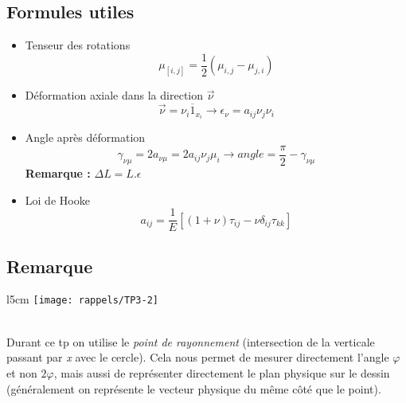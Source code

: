 \subsection*{Formules utiles}
\begin{itemize}
	\item Tenseur des rotations
		\begin{equation}
			\mu _{[i,j]} = \frac{1}{2}(\mu _{i,j} - \mu _{j,i})
		\end{equation}
		
	\item Déformation axiale dans la direction $\vec{\nu}$
		\begin{equation}
			\vec{\nu} = \nu _i \overline{1}_{x_i} \rightarrow \epsilon _{\nu} = a_{ij} \nu _j \nu _i
		\end{equation}
		
	\item	Angle après déformation 
		\begin{equation}
			\gamma _{\nu \mu} = 2 a_{\nu \mu} = 2 a_{ij} \nu _j \mu _i \rightarrow angle = \frac{\pi}{2} - \gamma _{\nu \mu} 
		\end{equation}
\textbf{Remarque :} $\Delta L = L.\epsilon$		
	\item Loi de Hooke
		\begin{equation}
			a_{ij} = \frac{1}{E}[(1+\nu)\tau _{ij} - \nu \delta _{ij}\tau _{kk}]
		\end{equation}							
\end{itemize}

\subsection*{Remarque}
\begin{wrapfigure}[7]{l}{5cm}
\texttt{[image: rappels/TP3-2]}
\end{wrapfigure}
\ \\ Durant ce tp on utilise le \textit{point de rayonnement} (intersection de la verticale passant par \textit{x} avec le cercle). Cela nous permet de mesurer directement l'angle $\varphi$ et non $2 \varphi$, mais aussi de représenter directement le plan physique sur le dessin (généralement on représente le vecteur physique du même côté que le point).\\


